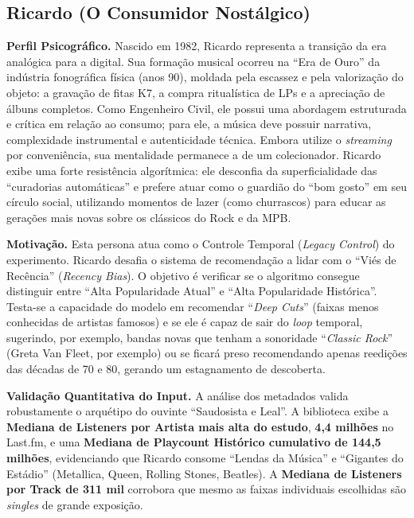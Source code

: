 \documentclass[12pt, %
openright,
oneside, %
a4paper,    %
english,   %
brazil]{facom-ufu-abntex2}
\begin{document}
\subsection{Ricardo (O Consumidor Nostálgico)}

\textbf{Perfil Psicográfico.} Nascido em 1982, Ricardo representa a transição da
era analógica para a digital. Sua formação musical ocorreu na ``Era de Ouro'' da
indústria fonográfica física (anos 90), moldada pela escassez e pela valorização
do objeto: a gravação de fitas K7, a compra ritualística de LPs e a apreciação de
álbuns completos. Como Engenheiro Civil, ele possui uma abordagem estruturada e
crítica em relação ao consumo; para ele, a música deve possuir narrativa,
complexidade instrumental e autenticidade técnica. Embora utilize o
\emph{streaming} por conveniência, sua mentalidade permanece a de um colecionador.
Ricardo exibe uma forte resistência algorítmica: ele desconfia da superficialidade
das ``curadorias automáticas'' e prefere atuar como o guardião do ``bom gosto'' em
seu círculo social, utilizando momentos de lazer (como churrascos) para educar as
gerações mais novas sobre os clássicos do Rock e da MPB.

\textbf{Motivação.} Esta persona atua como o Controle Temporal (\emph{Legacy
Control}) do experimento. Ricardo desafia o sistema de recomendação a lidar com o
``Viés de Recência'' (\emph{Recency Bias}). O objetivo é verificar se o algoritmo
consegue distinguir entre ``Alta Popularidade Atual'' e ``Alta Popularidade
Histórica''. Testa-se a capacidade do modelo em recomendar ``\emph{Deep Cuts}''
(faixas menos conhecidas de artistas famosos) e se ele é capaz de sair do
\emph{loop} temporal, sugerindo, por exemplo, bandas novas que tenham a sonoridade
``\emph{Classic Rock}'' (Greta Van Fleet, por exemplo) ou se ficará preso
recomendando apenas reedições das décadas de 70 e 80, gerando um estagnamento de
descoberta.

\textbf{Validação Quantitativa do Input.} A análise dos metadados valida
robustamente o arquétipo do ouvinte ``Saudosista e Leal''. A biblioteca exibe a
\textbf{Mediana de Listeners por Artista mais alta do estudo}, \textbf{4,4
milhões} no Last.fm, e uma \textbf{Mediana de Playcount Histórico cumulativo
de 144,5 milhões}, evidenciando que Ricardo consome ``Lendas da Música'' e
``Gigantes do Estádio'' (Metallica, Queen, Rolling Stones, Beatles). A
\textbf{Mediana de Listeners por Track de 311 mil} corrobora que mesmo as faixas
individuais escolhidas são \emph{singles} de grande exposição.
\end{document}
